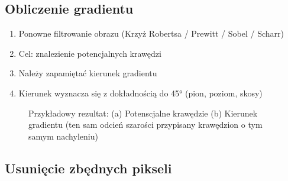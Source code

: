\documentclass[a4paper,twocolumn,12pt]{article}
\begin{document}
\subsection{Obliczenie gradientu}

\begin{enumerate}
 \item Ponowne filtrowanie obrazu (Krzyż Robertsa / Prewitt / Sobel / Scharr)
 \item Cel: znalezienie potencjalnych krawędzi
 \item Należy zapamiętać kierunek gradientu
 \item Kierunek wyznacza się z dokładnością do 45° (pion, poziom, skosy)
\end{enumerate}

\begin{figure}[!ht]
 \begin{center}
 \end{center}
 \caption{
  Przykładowy rezultat:
  (a) Potenscjalne krawędzie
  (b) Kierunek gradientu (ten sam odcień szarości przypisany krawędzion o tym samym nachyleniu)
 }
 \label{fig:canny_gradient}
\end{figure}


\subsection{Usunięcie zbędnych pikseli}
\end{document}
